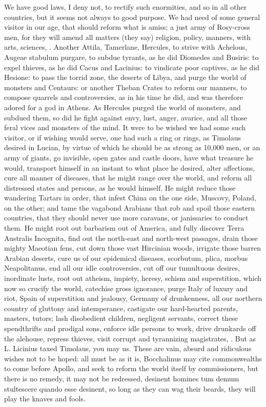 {We have good laws, I deny not, to rectify such enormities, and so in
all other countries, but it seems not always to good purpose. We had
need of some general visitor in our age, that should reform what is
amiss; a just army of Rosy-cross men, for they will amend all matters
(they say) religion, policy, manners, with arts, sciences, \etc{}. Another
Attila, Tamerlane, Hercules, to strive with Achelous, Augeae stabulum
purgare, to subdue tyrants, as he did Diomedes and Busiris: to
expel thieves, as he did Cacus and Lacinius: to vindicate poor
captives, as he did Hesione: to pass the torrid zone, the deserts of
Libya, and purge the world of monsters and Centaurs: or another Theban
Crates to reform our manners, to compose quarrels and controversies, as
in his time he did, and was therefore adored for a god in Athens. As
Hercules purged the world of monsters, and subdued them, so did he
fight against envy, lust, anger, avarice, \etc{} and all those feral vices
and monsters of the mind. It were to be wished we had some such
visitor, or if wishing would serve, one had such a ring or rings, as
Timolaus desired in Lucian, by virtue of which he should be as
strong as 10,000 men, or an army of giants, go invisible, open gates
and castle doors, have what treasure he would, transport himself in an
instant to what place he desired, alter affections, cure all manner of
diseases, that he might range over the world, and reform all distressed
states and persons, as he would himself. He might reduce those
wandering Tartars in order, that infest China on the one side, Muscovy,
Poland, on the other; and tame the vagabond Arabians that rob and spoil
those eastern countries, that they should never use more caravans, or
janissaries to conduct them. He might root out barbarism out of
America, and fully discover Terra Australis Incognita, find out the
north-east and north-west passages, drain those mighty Maeotian fens,
cut down those vast Hircinian woods, irrigate those barren Arabian
deserts, \etc{} cure us of our epidemical diseases, scorbutum, plica,
morbus Neapolitanus, \etc{} end all our idle controversies, cut off our
tumultuous desires, inordinate lusts, root out atheism, impiety,
heresy, schism and superstition, which now so crucify the world,
catechise gross ignorance, purge Italy of luxury and riot, Spain of
superstition and jealousy, Germany of drunkenness, all our northern
country of gluttony and intemperance, castigate our hard-hearted
parents, masters, tutors; lash disobedient children, negligent
servants, correct these spendthrifts and prodigal sons, enforce idle
persons to work, drive drunkards off the alehouse, repress thieves,
visit corrupt and tyrannizing magistrates, \etc{}. But as L. Licinius taxed
Timolaus, you may us. These are vain, absurd and ridiculous wishes not
to be hoped: all must be as it is, Bocchalinus may cite
commonwealths to come before Apollo, and seek to reform the world
itself by commissioners, but there is no remedy, it may not be
redressed, desinent homines tum demum stultescere quando esse desinent,
so long as they can wag their beards, they will play the knaves and
fools.

}
